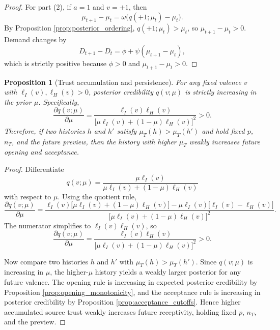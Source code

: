 \documentclass[12pt,american]{article}
\newtheorem{proposition}{Proposition}
\begin{document}
\begin{refsection}
\begin{proof}
			For part (2), if \(a=1\) and \(v=+1\), then
			\[
			\mu_{t+1}-\mu_t=\omega\big(q(+1;\mu_t)-\mu_t\big).
			\]
			By Proposition \ref{prop:posterior_ordering}, \(q(+1;\mu_t)>\mu_t\), so \(\mu_{t+1}-\mu_t>0\). Demand changes by
			\[
			D_{t+1}-D_t
			=
			\phi+\psi(\mu_{t+1}-\mu_t),
			\]
			which is strictly positive because \(\phi>0\) and \(\mu_{t+1}-\mu_t>0\).
		\end{proof}
		
		\begin{proposition}[Trust accumulation and persistence]
			\label{prop:trust_persistence}
			For any fixed valence \(v\) with \(\ell_I(v),\ell_H(v)>0\), posterior credibility \(q(v;\mu)\) is strictly increasing in the prior \(\mu\). Specifically,
			\[
			\frac{\partial q(v;\mu)}{\partial \mu}
			=
			\frac{\ell_I(v)\ell_H(v)}
			{\big[\mu \ell_I(v)+(1-\mu)\ell_H(v)\big]^2}>0.
			\]
			Therefore, if two histories \(h\) and \(h'\) satisfy \(\mu_T(h)>\mu_T(h')\) and hold fixed \(p\), \(n_T\), and the future preview, then the history with higher \(\mu_T\) weakly increases future opening and acceptance.
		\end{proposition}
		
		\begin{proof}
			Differentiate
			\[
			q(v;\mu)=\frac{\mu \ell_I(v)}{\mu \ell_I(v)+(1-\mu)\ell_H(v)}
			\]
			with respect to \(\mu\). Using the quotient rule,
			\[
			\frac{\partial q(v;\mu)}{\partial \mu}
			=
			\frac{\ell_I(v)\big[\mu \ell_I(v)+(1-\mu)\ell_H(v)\big]-\mu \ell_I(v)\big[\ell_I(v)-\ell_H(v)\big]}
			{\big[\mu \ell_I(v)+(1-\mu)\ell_H(v)\big]^2}.
			\]
			The numerator simplifies to \(\ell_I(v)\ell_H(v)\), so
			\[
			\frac{\partial q(v;\mu)}{\partial \mu}
			=
			\frac{\ell_I(v)\ell_H(v)}
			{\big[\mu \ell_I(v)+(1-\mu)\ell_H(v)\big]^2}>0.
			\]
			
			Now compare two histories \(h\) and \(h'\) with \(\mu_T(h)>\mu_T(h')\). Since \(q(v;\mu)\) is increasing in \(\mu\), the higher-\(\mu\) history yields a weakly larger posterior for any future valence. The opening rule is increasing in expected posterior credibility by Proposition \ref{prop:opening_monotonicity}, and the acceptance rule is increasing in posterior credibility by Proposition \ref{prop:acceptance_cutoffs}. Hence higher accumulated source trust weakly increases future receptivity, holding fixed \(p\), \(n_T\), and the preview.
		\end{proof}
		

\end{refsection}
\end{document}
